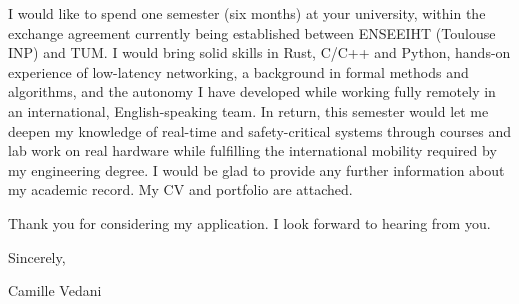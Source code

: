\documentclass[11pt]{article}
\newcommand{\myname}{Camille Vedani}
\begin{document}
I would like to spend one semester (six months) at your university, within the exchange agreement currently being established between ENSEEIHT (Toulouse INP) and TUM. I would bring
solid skills in Rust, C/C++ and Python, hands-on experience of low-latency networking, a background in
formal methods and algorithms, and the autonomy I have developed while working fully remotely in an international,
English-speaking team. In return, this semester would let me deepen my knowledge of real-time and safety-critical systems through courses and lab work on real
hardware while fulfilling the
international mobility required by my engineering degree. I would be glad to provide any further
information about my academic record. My CV and portfolio are attached.

Thank you for considering my application. I look forward to hearing from you.

Sincerely,

\vspace{1.8em}
\myname
\end{document}
